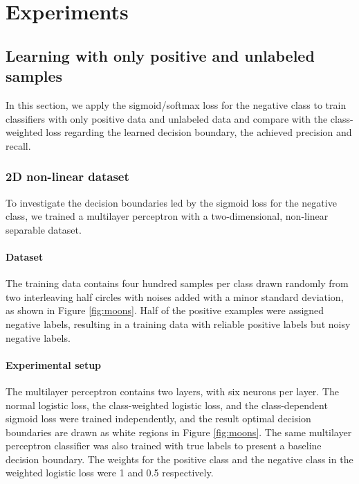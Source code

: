 \section{Experiments}
\label{sec:experiments}



\subsection{Learning with only positive and unlabeled samples}
\label{subsec:pulearning}


In this section, we apply the sigmoid/softmax loss for the negative class to train classifiers with only positive data and unlabeled data and compare with the class-weighted loss regarding the learned decision boundary, the achieved precision and recall.

\subsubsection{2D non-linear dataset}

To investigate the decision boundaries led by the sigmoid loss for the negative class, we trained a multilayer perceptron with a two-dimensional, non-linear separable dataset.

\paragraph{Dataset}
The training data contains four hundred samples per class drawn randomly from two interleaving half circles with noises added with a minor standard deviation, as shown in Figure \ref{fig:moons}.
Half of the positive examples were assigned negative labels, resulting in a training data with reliable positive labels but noisy negative labels.


\paragraph{Experimental setup}
The multilayer perceptron contains two layers, with six neurons per layer.
The normal logistic loss, the class-weighted logistic loss, and the class-dependent sigmoid loss were trained independently, and the result optimal decision boundaries are drawn as white regions in Figure \ref{fig:moons}.
The same multilayer perceptron classifier was also trained with true labels to present a baseline decision boundary.
The weights for the positive class and the negative class in the weighted logistic loss were 1 and 0.5 respectively.

